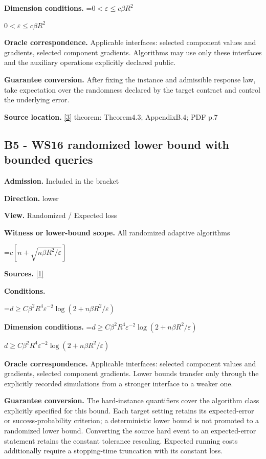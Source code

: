 \documentclass[10pt,a4paper]{article}
\newcommand{\AtlasMath}[1]{\par\begingroup\centering\setbox0=\hbox{$\displaystyle #1$}\ifdim\wd0>1.4\linewidth\typeout{ATLAS WIDE FORMULA: \the\wd0}\fi\ifdim\wd0>\linewidth\resizebox{\linewidth}{!}{\box0}\else\box0\fi\par\endgroup}
\newcommand{\AtlasInlineMath}[1]{\begingroup\setbox0=\hbox{$#1$}\ifdim\wd0>.4\linewidth\endgroup\AtlasMath{#1}\else\endgroup$#1$\fi}
\begin{document}
\textbf{Dimension conditions.} \AtlasInlineMath{0<\varepsilon\le c\beta R^2}

\textbf{Oracle correspondence.} Applicable interfaces: selected component values and gradients, selected component gradients. Algorithms may use only these interfaces and the auxiliary operations explicitly declared public.

\textbf{Guarantee conversion.} After fixing the instance and admissible response law, take expectation over the randomness declared by the target contract and control the underlying error.

\textbf{Source location.} \href{https://proceedings.mlr.press/v162/carmon22a/carmon22a.pdf}{[3]} theorem: Theorem4.3; AppendixB.4; PDF p.7

\subsection{B5 - WS16 randomized lower bound with bounded queries}
\textbf{Admission.} Included in the bracket

\textbf{Direction.} lower

\textbf{View.} Randomized / Expected loss

\textbf{Witness or lower-bound scope.} All randomized adaptive algorithms

\AtlasMath{c[n+\sqrt{n\beta R^2/\varepsilon}]}
\textbf{Sources.} \href{https://arxiv.org/pdf/1605.08003v3}{[1]}

\textbf{Conditions.} 
\AtlasMath{d\ge C\beta^2R^4\varepsilon^{-2}\log(2+n\beta R^2/\varepsilon)}


\textbf{Dimension conditions.} \AtlasInlineMath{d\ge C\beta^2R^4\varepsilon^{-2}\log(2+n\beta R^2/\varepsilon)}

\textbf{Oracle correspondence.} Applicable interfaces: selected component values and gradients, selected component gradients. Lower bounds transfer only through the explicitly recorded simulations from a stronger interface to a weaker one.

\textbf{Guarantee conversion.} The hard-instance quantifiers cover the algorithm class explicitly specified for this bound. Each target setting retains its expected-error or success-probability criterion; a deterministic lower bound is not promoted to a randomized lower bound. Converting the source hard event to an expected-error statement retains the constant tolerance rescaling. Expected running costs additionally require a stopping-time truncation with its constant loss.
\end{document}
